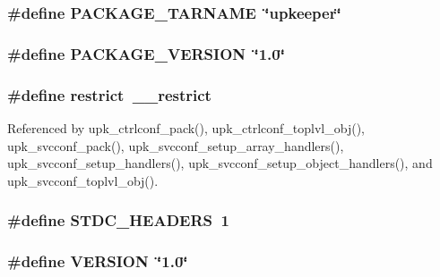 \subsubsection[{PACKAGE\_\-TARNAME}]{\setlength{\rightskip}{0pt plus 5cm}\#define PACKAGE\_\-TARNAME~\char`\"{}upkeeper\char`\"{}}\label{upkeeper__config_8h_af415af6bfede0e8d5453708afe68651c}
\subsubsection[{PACKAGE\_\-VERSION}]{\setlength{\rightskip}{0pt plus 5cm}\#define PACKAGE\_\-VERSION~\char`\"{}1.0\char`\"{}}\label{upkeeper__config_8h_aa326a05d5e30f9e9a4bb0b4469d5d0c0}
\subsubsection[{restrict}]{\setlength{\rightskip}{0pt plus 5cm}\#define restrict~\_\-\_\-restrict}\label{upkeeper__config_8h_a080abdcb9c02438f1cd2bb707af25af8}


Referenced by upk\_\-ctrlconf\_\-pack(), upk\_\-ctrlconf\_\-toplvl\_\-obj(), upk\_\-svcconf\_\-pack(), upk\_\-svcconf\_\-setup\_\-array\_\-handlers(), upk\_\-svcconf\_\-setup\_\-handlers(), upk\_\-svcconf\_\-setup\_\-object\_\-handlers(), and upk\_\-svcconf\_\-toplvl\_\-obj().

\subsubsection[{STDC\_\-HEADERS}]{\setlength{\rightskip}{0pt plus 5cm}\#define STDC\_\-HEADERS~1}\label{upkeeper__config_8h_a550e5c272cc3cf3814651721167dcd23}
\subsubsection[{VERSION}]{\setlength{\rightskip}{0pt plus 5cm}\#define VERSION~\char`\"{}1.0\char`\"{}}\label{upkeeper__config_8h_a1c6d5de492ac61ad29aec7aa9a436bbf}
